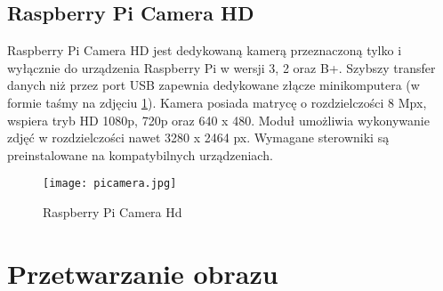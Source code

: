 \subsection{Raspberry Pi Camera HD}
Raspberry Pi Camera HD jest dedykowaną kamerą przeznaczoną tylko i wyłącznie do urządzenia Raspberry Pi w wersji 3, 2 oraz B+. Szybszy transfer danych niż przez port USB zapewnia dedykowane złącze minikomputera (w formie taśmy na zdjęciu \ref{fig:picamera}). Kamera posiada matrycę o rozdzielczości 8 Mpx, wspiera tryb HD 1080p, 720p oraz 640 x 480. Moduł umożliwia wykonywanie zdjęć w rozdzielczości nawet 3280 x 2464 px. Wymagane sterowniki są preinstalowane na kompatybilnych urządzeniach.
\begin{figure}[H]
	\centering
	\texttt{[image: picamera.jpg]}
	\caption{Raspberry Pi Camera Hd}
	\label{fig:picamera}
\end{figure}

\section{Przetwarzanie obrazu}
